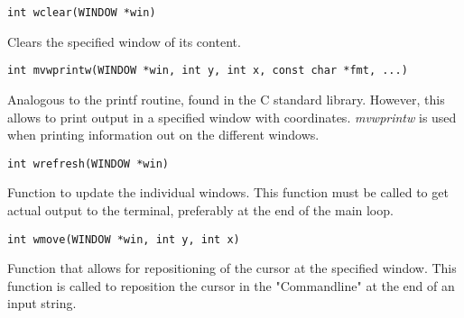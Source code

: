 \documentclass[main.tex]{subfiles}
\begin{document}
\begin{lstlisting}[frame=single] 
int wclear(WINDOW *win)
\end{lstlisting}
Clears the specified window of its content. \\

\begin{lstlisting}[frame=single] 
int mvwprintw(WINDOW *win, int y, int x, const char *fmt, ...)
\end{lstlisting}
Analogous to the printf routine, found in the C standard library. However, this allows to print output in a specified window with coordinates. \textit{mvwprintw} is used when printing information out on the different windows. \\

\begin{lstlisting}[frame=single] 
int wrefresh(WINDOW *win)
\end{lstlisting}
Function to update the individual windows. This function must be called to get actual output to the terminal, preferably at the end of the main loop. \\

\begin{lstlisting}[frame=single] 
int wmove(WINDOW *win, int y, int x)
\end{lstlisting}
Function that allows for repositioning of the cursor at the specified window. This function is called to reposition the cursor in the "Commandline" at the end of an input string.
\end{document}
